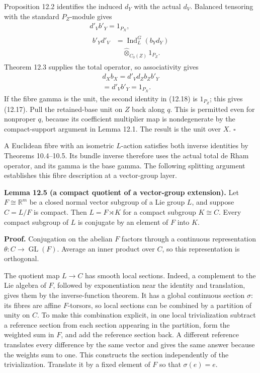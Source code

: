 \documentclass[
  11pt,
]{article}
\begin{document}
Proposition 12.2 identifies the induced \(d_Y\) with the actual \(d_V\).
Balanced tensoring with the standard \(P_Z\)-module gives \[
\begin{gathered}
d'_Vb'_Y=1_{P_X},\\
\begin{aligned}
b'_Yd'_V&=\operatorname{Ind}_L^G(b_Yd_Y)\\
&\quad\widehat\otimes_{C_0(Z)}1_{P_Z}.
\end{aligned}
\end{gathered}
\tag{12.18}
\] Theorem 12.3 supplies the total operator, so associativity gives \[
\begin{gathered}
d_Xb_X=d'_Vd_Zb_Zb'_Y\\
=d'_Vb'_Y=1_{P_X}.
\end{gathered}
\tag{12.19}
\] If the fibre gamma is the unit, the second identity in (12.18) is
\(1_{P_Z}\); this gives (12.17). Pull the retained-base unit on \(Z\)
back along \(q\). This is permitted even for nonproper \(q\), because
its coefficient multiplier map is nondegenerate by the compact-support
argument in Lemma 12.1. The result is the unit over \(X\). \(\square\)

A Euclidean fibre with an isometric \(L\)-action satisfies both inverse
identities by Theorems 10.4--10.5. Its bundle inverse therefore uses the
actual total de Rham operator, and its gamma is the base gamma. The
following splitting argument establishes this fibre description at a
vector-group layer.

\textbf{Lemma 12.5 (a compact quotient of a vector-group extension).}
Let \(F\cong\mathbb R^m\) be a closed normal vector subgroup of a Lie
group \(L\), and suppose \(C=L/F\) is compact. Then \(L=F\rtimes K\) for
a compact subgroup \(K\cong C\). Every compact subgroup of \(L\) is
conjugate by an element of \(F\) into \(K\).

\textbf{Proof.} Conjugation on the abelian \(F\) factors through a
continuous representation \(\theta:C\to\operatorname{GL}(F)\). Average
an inner product over \(C\), so this representation is orthogonal.

The quotient map \(L\to C\) has smooth local sections. Indeed, a
complement to the Lie algebra of \(F\), followed by exponentiation near
the identity and translation, gives them by the inverse-function
theorem. It has a global continuous section \(\sigma\): its fibres are
affine \(F\)-torsors, so local sections can be combined by a partition
of unity on \(C\). To make this combination explicit, in one local
trivialization subtract a reference section from each section appearing
in the partition, form the weighted sum in \(F\), and add the reference
section back. A different reference translates every difference by the
same vector and gives the same answer because the weights sum to one.
This constructs the section independently of the trivialization.
Translate it by a fixed element of \(F\) so that \(\sigma(e)=e\).
\end{document}

